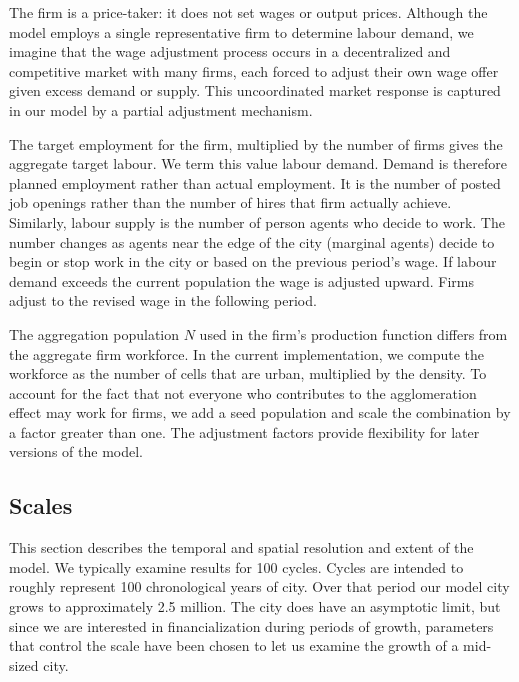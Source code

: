 The firm  is a price-taker: it does not set wages or output prices. Although the model employs a single representative firm to determine labour demand, we imagine that the wage adjustment process occurs in a decentralized and competitive market with many firms, each forced to adjust their own wage offer given excess demand or supply. This uncoordinated market response is captured in our model by a partial adjustment mechanism. 

The target employment for the firm, multiplied by the number of firms gives the aggregate target labour. We term this value labour demand.  Demand is therefore planned employment rather than actual employment.  It is the number of posted job openings rather than the number of hires that firm actually achieve.  %
Similarly, labour supply is the number of person agents who decide to work. The number changes as agents  near the edge of the city (marginal agents) decide to begin or stop work in the city or based on the previous period's wage. 
If labour demand exceeds the current population the wage is adjusted upward. Firms adjust to the revised wage in the following period.

The aggregation population $N$ used in the firm's production function differs from the aggregate firm workforce. In the current implementation, we compute the workforce as the number of cells that are urban, multiplied by the density. To account for the fact that not everyone who contributes to the agglomeration effect may work for firms, we add a seed population and scale the combination by a factor greater than one. The adjustment factors provide flexibility for later versions of the model.
     
\subsection{Scales}
This section describes the temporal and spatial resolution and extent of the model. 
We typically examine results for 100 cycles. Cycles are intended to roughly represent 100 chronological years of city.  Over that period our model city grows to approximately 2.5 million. The city does have an asymptotic limit, but since we are interested in financialization during periods of growth, parameters that control the scale have been chosen to let us examine the growth of a mid-sized city.  

